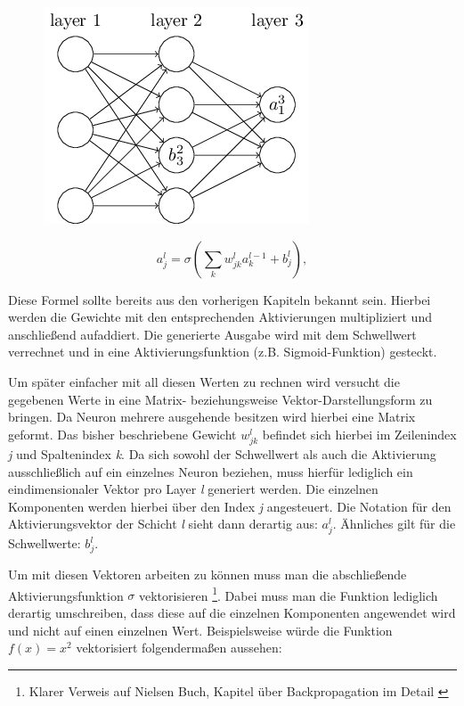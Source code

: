 \begin{figure}[!htb]
	\centering
	\includegraphics[width=.4\linewidth]{img/biasAct_notation}
	\label{fig:biasAct_not}
\end{figure}

\begin{equation} \label{eq:act}
a^{l}_j = \sigma\left( \sum_k w^{l}_{jk} a^{l-1}_k + b^l_j \right),
\end{equation}

Diese Formel sollte bereits aus den vorherigen Kapiteln bekannt sein. Hierbei werden die Gewichte mit den entsprechenden Aktivierungen multipliziert und anschließend aufaddiert. Die generierte Ausgabe wird mit dem Schwellwert verrechnet und in eine Aktivierungsfunktion (z.B. Sigmoid-Funktion) gesteckt.

Um später einfacher mit all diesen Werten zu rechnen wird versucht die gegebenen Werte in eine Matrix- beziehungsweise Vektor-Darstellungsform zu bringen. Da Neuron mehrere ausgehende  besitzen wird hierbei eine Matrix geformt. Das bisher beschriebene Gewicht $w^l_{jk}$ befindet sich hierbei im Zeilenindex \emph{j} und Spaltenindex \emph{k}. Da sich sowohl der Schwellwert als auch die Aktivierung ausschließlich auf ein einzelnes Neuron beziehen, muss hierfür lediglich ein eindimensionaler Vektor pro Layer \emph{l} generiert werden. Die einzelnen Komponenten werden hierbei über den Index \emph{j} angesteuert. Die Notation für den Aktivierungsvektor der Schicht \emph{l} sieht dann derartig aus: $a^l_j$. Ähnliches gilt für die Schwellwerte: $b^l_j$. 

Um mit diesen Vektoren arbeiten zu können muss man die abschließende Aktivierungsfunktion $\sigma$ vektorisieren
\footnote{Klarer Verweis auf Nielsen Buch, Kapitel über Backpropagation im Detail \cite{dlnielsen}}. 
Dabei muss man die Funktion lediglich derartig umschreiben, dass diese auf die einzelnen Komponenten angewendet wird und nicht auf einen einzelnen Wert. Beispielsweise würde die Funktion $f(x) = x^2$ vektorisiert folgendermaßen aussehen: 

